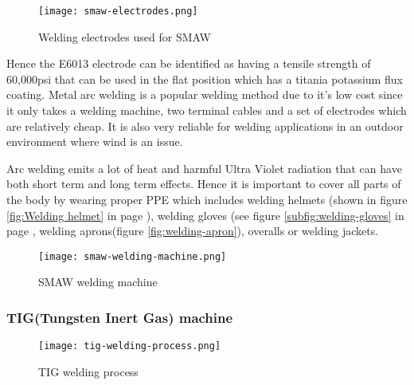 \documentclass[a4paper,12pt]{article}
\begin{document}
						\begin{figure}[H]
							\centering				
							\texttt{[image: smaw-electrodes.png]}				
							\caption{Welding electrodes used for SMAW}
							\label{fig:smaw-electrodes}
						\end{figure}				
				
				Hence the E6013 electrode can be identified as having a tensile strength of 60,000psi that can be used in the flat position which has a titania potassium flux coating. Metal arc welding is a popular welding method due to it's low cost since it only takes a welding machine, two terminal cables and a set of electrodes which are relatively cheap. It is also very reliable for welding applications in an outdoor environment where wind is an issue.
				
				 Arc welding emits a lot of heat and harmful Ultra Violet radiation that can have both short term and long term effects.
				 Hence it is important to cover all parts of the body by wearing proper PPE which includes welding helmets (shown in figure \ref{fig:Welding helmet} in page \pageref{fig:Welding helmet}), welding gloves (see figure \ref{subfig:welding-gloves} in page \pageref{fig:types-of-gloves}, welding aprons(figure \ref{fig:welding-apron}), overalls or welding jackets.  
				
						\begin{figure}[H]
							\centering				
							\texttt{[image: smaw-welding-machine.png]}				
							\caption{SMAW welding machine}
							\label{fig:smaw-welding-machine}
						\end{figure}
												
				\subsubsection*{TIG(Tungsten Inert Gas) machine}
						
						\begin{figure}[H]
							\centering				
							\texttt{[image: tig-welding-process.png]}		
							\caption{TIG welding process\citep{tig-welding-circuit}}
							\label{fig:tig-welding-process}
						\end{figure}				
						
\end{document}
